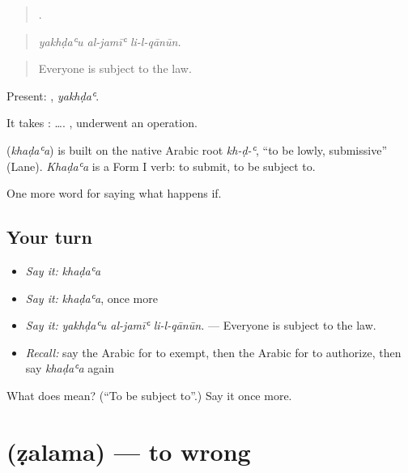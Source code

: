 \begin{quote}
  .
\end{quote}

\begin{quote}
\emph{yakhḍaʿu al-jamīʿ li-l-qānūn.}
\end{quote}

\begin{quote}
Everyone is subject to the law.
\end{quote}

Present: , \emph{yakhḍaʿ}.

It takes :   ….  , underwent an operation.

\begin{cousinweb}
\textbf{} (\emph{khaḍaʿa}) is built on the native Arabic root \emph{kh-ḍ-ʿ}, \textquotedblleft{}to be lowly, submissive\textquotedblright{} (Lane). \emph{Khaḍaʿa} is a Form I verb: to submit, to be subject to.
\end{cousinweb}

\begin{grammarlens}[title={What you've built}]
One more word for saying what happens if.
\end{grammarlens}

\subsection*{Your turn}
\begin{itemize}
\raggedright
  \item \emph{Say it:} \emph{khaḍaʿa}
  \item \emph{Say it:} \emph{khaḍaʿa}, once more
  \item \emph{Say it:} \emph{yakhḍaʿu al-jamīʿ li-l-qānūn.} — Everyone is subject to the law.
  \item \emph{Recall:} say the Arabic for to exempt, then the Arabic for to authorize, then say \emph{khaḍaʿa} again
\end{itemize}

\begin{tcolorbox}[breakable,colback=teal!4,colframe=teal!35!black,title={Before you move on}]
What does  mean? (\textquotedblleft{}To be subject to\textquotedblright{}.) Say it once more.
\end{tcolorbox}
\section[\texorpdfstring{\ar{ظلم} (ẓalama)}{ظلم (ẓalama)}]{ (ẓalama) — to wrong}

